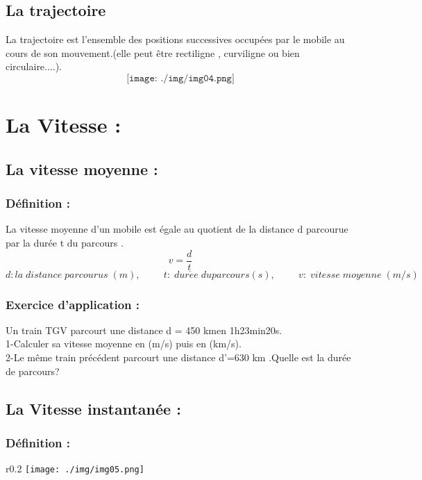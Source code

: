 \documentclass[12pt]{article}
\begin{document}
\subsection{La trajectoire}
La trajectoire est l'ensemble des positions successives occupées par le mobile au cours de son mouvement.(elle
peut être rectiligne , curviligne ou bien circulaire....).
\\$$\texttt{[image: ./img/img04.png]}$$


\section{La Vitesse : }
\subsection{La vitesse moyenne : }
\subsubsection{Définition : }
La vitesse moyenne d'un mobile est égale au quotient de la distance d parcourue par la durée t du parcours .
$$v = \frac{d}{t}$$
$$d : la\; distance \; parcourus \;(m),\hspace{1cm} t:\; dur\acute{e}e \;du parcours(s),\hspace{1cm}v : \;vitesse\; moyenne \;(m/s)$$

\subsubsection{Exercice d'application : }
Un train TGV parcourt une distance d = 450 kmen 1h23min20s.\\
1-Calculer sa vitesse moyenne en (m/s) puis en (km/s).\\
2-Le même train précédent parcourt une distance d'=630 km .Quelle est la durée de parcours? 

\subsection{La Vitesse instantanée : }
\subsubsection{Définition : }
\begin{wrapfigure}{r}{0.2\textwidth}
    \texttt{[image: ./img/img05.png]}
\end{wrapfigure}
\end{document}
